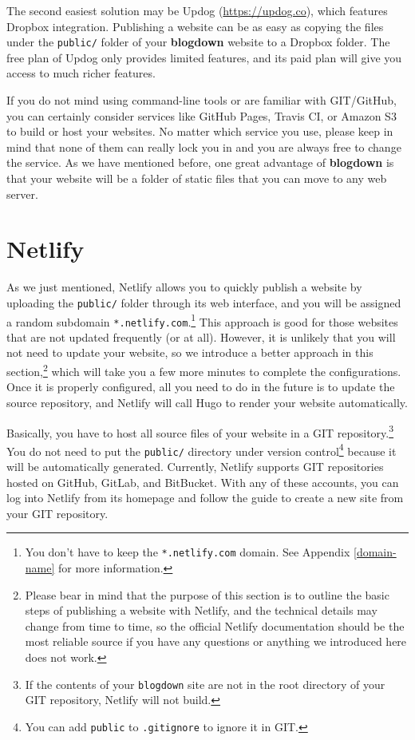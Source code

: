 \documentclass[12pt,]{krantz}
\theoremstyle{definition}
\theoremstyle{definition}
\theoremstyle{definition}
\theoremstyle{remark}
\begin{document}
The second easiest solution may be Updog (\url{https://updog.co}), which
features Dropbox integration. Publishing a website can be as easy as
copying the files under the \texttt{public/} folder of your
\textbf{blogdown} website to a Dropbox folder. The free plan of Updog
only provides limited features, and its paid plan will give you access
to much richer features.

If you do not mind using command-line tools or are familiar with
GIT/GitHub, you can certainly consider services like GitHub Pages,
Travis CI, or Amazon S3 to build or host your websites. No matter which
service you use, please keep in mind that none of them can really lock
you in and you are always free to change the service. As we have
mentioned before, one great advantage of \textbf{blogdown} is that your
website will be a folder of static files that you can move to any web
server.

\hypertarget{netlify}{%
\section{Netlify}\label{netlify}}

As we just mentioned, Netlify allows you to quickly
publish a website by uploading the \texttt{public/} folder through its
web interface, and you will be assigned a random subdomain
\texttt{*.netlify.com}.\footnote{You don't have to keep the
  \texttt{*.netlify.com} domain. See Appendix \ref{domain-name} for more
  information.} This approach is good for those websites that are not
updated frequently (or at all). However, it is unlikely that you will
not need to update your website, so we introduce a better approach in
this section,\footnote{Please bear in mind that the purpose of this
  section is to outline the basic steps of publishing a website with
  Netlify, and the technical details may change from time to time, so
  the official Netlify documentation should be the most reliable source
  if you have any questions or anything we introduced here does not
  work.} which will take you a few more minutes to complete the
configurations. Once it is properly configured, all you need to do in
the future is to update the source repository, and Netlify will call
Hugo to render your website automatically.

Basically, you have to host all source files of your website in a GIT
repository.\footnote{If the contents of your \texttt{blogdown} site are
  not in the root directory of your GIT repository, Netlify will not
  build.} You do not need to put the \texttt{public/} directory under
version control\footnote{You can add \texttt{public} to
  \texttt{.gitignore} to ignore it in GIT.} because it will be
automatically generated. Currently, Netlify supports GIT repositories
hosted on GitHub, GitLab, and BitBucket. With any of these accounts, you
can log into Netlify from its homepage and follow the guide to create a
new site from your GIT repository.
\end{document}
